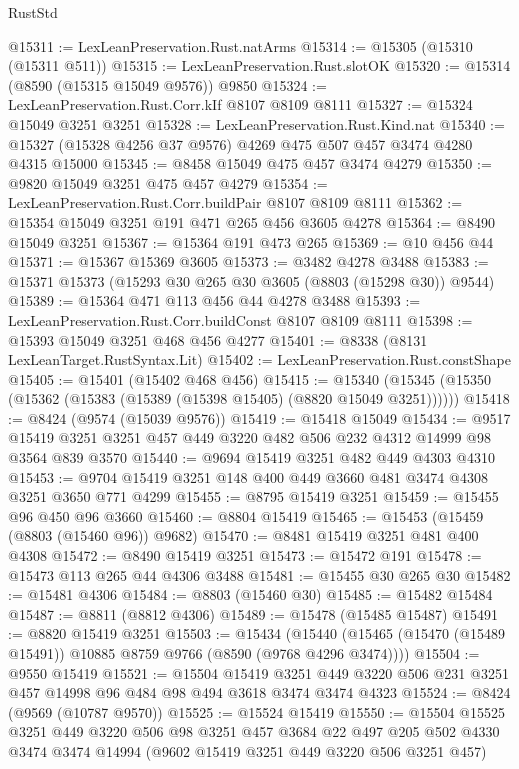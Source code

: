 \begin{lexlean}{RustStd}
\begin{coremodule}
@15311 := LexLeanPreservation.Rust.natArms
@15314 := @15305 (@15310 (@15311 @511))
@15315 := LexLeanPreservation.Rust.slotOK
@15320 := @15314 (@8590 (@15315 @15049 @9576)) @9850
@15324 := LexLeanPreservation.Rust.Corr.kIf @8107 @8109 @8111
@15327 := @15324 @15049 @3251 @3251
@15328 := LexLeanPreservation.Rust.Kind.nat
@15340 := @15327 (@15328 @4256 @37 @9576) @4269 @475 @507 @457 @3474 @4280 @4315 @15000
@15345 := @8458 @15049 @475 @457 @3474 @4279
@15350 := @9820 @15049 @3251 @475 @457 @4279
@15354 := LexLeanPreservation.Rust.Corr.buildPair @8107 @8109 @8111
@15362 := @15354 @15049 @3251 @191 @471 @265 @456 @3605 @4278
@15364 := @8490 @15049 @3251
@15367 := @15364 @191 @473 @265
@15369 := @10 @456 @44
@15371 := @15367 @15369 @3605
@15373 := @3482 @4278 @3488
@15383 := @15371 @15373 (@15293 @30 @265 @30 @3605 (@8803 (@15298 @30)) @9544)
@15389 := @15364 @471 @113 @456 @44 @4278 @3488
@15393 := LexLeanPreservation.Rust.Corr.buildConst @8107 @8109 @8111
@15398 := @15393 @15049 @3251 @468 @456 @4277
@15401 := @8338 (@8131 LexLeanTarget.RustSyntax.Lit)
@15402 := LexLeanPreservation.Rust.constShape
@15405 := @15401 (@15402 @468 @456)
@15415 := @15340 (@15345 (@15350 (@15362 (@15383 (@15389 (@15398 @15405) (@8820 @15049 @3251))))))
@15418 := @8424 (@9574 (@15039 @9576))
@15419 := @15418 @15049
@15434 := @9517 @15419 @3251 @3251 @457 @449 @3220 @482 @506 @232 @4312 @14999 @98 @3564 @839 @3570
@15440 := @9694 @15419 @3251 @482 @449 @4303 @4310
@15453 := @9704 @15419 @3251 @148 @400 @449 @3660 @481 @3474 @4308 @3251 @3650 @771 @4299
@15455 := @8795 @15419 @3251
@15459 := @15455 @96 @450 @96 @3660
@15460 := @8804 @15419
@15465 := @15453 (@15459 (@8803 (@15460 @96)) @9682)
@15470 := @8481 @15419 @3251 @481 @400 @4308
@15472 := @8490 @15419 @3251
@15473 := @15472 @191
@15478 := @15473 @113 @265 @44 @4306 @3488
@15481 := @15455 @30 @265 @30
@15482 := @15481 @4306
@15484 := @8803 (@15460 @30)
@15485 := @15482 @15484
@15487 := @8811 (@8812 @4306)
@15489 := @15478 (@15485 @15487)
@15491 := @8820 @15419 @3251
@15503 := @15434
    (@15440 (@15465 (@15470 (@15489 @15491)) @10885 @8759 @9766 (@8590 (@9768 @4296 @3474))))
@15504 := @9550 @15419
@15521 := @15504
    @15419
    @3251
    @449
    @3220
    @506
    @231
    @3251
    @457
    @14998
    @96
    @484
    @98
    @494
    @3618
    @3474
    @3474
    @4323
@15524 := @8424 (@9569 (@10787 @9570))
@15525 := @15524 @15419
@15550 := @15504
    @15525
    @3251
    @449
    @3220
    @506
    @98
    @3251
    @457
    @3684
    @22
    @497
    @205
    @502
    @4330
    @3474
    @3474
    @14994
    (@9602 @15419 @3251 @449 @3220 @506 @3251 @457)

\end{coremodule}
\end{lexlean}
